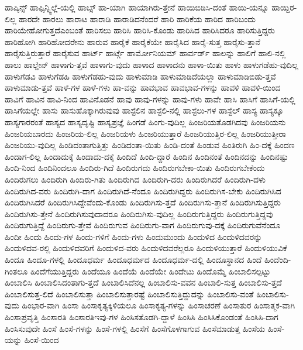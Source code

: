 {ಹಾಪ್ಕಿನ್ಸ್
ಹಾಫ್ಕಿನ್ಸ್ವಿಲ್ಲೆ-ಯಲ್ಲಿ
ಹಾಬ್ಸ್
ಹಾ-ಯಾಗಿ
ಹಾಯಾಗಿರು-ತ್ತೇನೆ
ಹಾಯಿಬಿಡಿಸಿ-ದಂತೆ
ಹಾಯಿ-ಯನ್ನೂ
ಹಾಯ್ದಿರ-ಲಿಲ್ಲ
ಹಾರದೇ
ಹಾರಲು
ಹಾರಾಟ
ಹಾರಾಡಿ
ಹಾರಾಡಿದನೆಂದರೆ
ಹಾರಿ
ಹಾರಿಕೆಯ
ಹಾರಿದ
ಹಾರಿಬಂದು
ಹಾರಿಯೇಹೋಗುತ್ತದೆಎಂಬಂತೆ
ಹಾರಿಸಲು
ಹಾರಿಸಿ
ಹಾರಿಸಿ-ಕೊಂಡು
ಹಾರಿಸಿದ
ಹಾರಿಸಿದರೂ
ಹಾರಿಸುತ್ತಿದ್ದರು
ಹಾರಿಹೋಗಿ
ಹಾರಿಹೋದರೇನು
ಹಾರುವ
ಹಾರೈಕೆ
ಹಾರೈಕೆಯೇ
ಹಾರೈಸಿದ
ಹಾರೈ-ಸುತ್ತ
ಹಾರೈಸು-ತ್ತಾನೆ
ಹಾರೈಸುತ್ತಿರುತ್ತಾರೆ
ಹಾರೈಸುವ
ಹಾರ್ಟ್
ಹಾರ್ಟ್ಗೆ
ಹಾರ್ಮೋನಿಯಮ್
ಹಾರ್ವರ್ಡ್
ಹಾಲನ್ನು
ಹಾಲಿಗೆ
ಹಾಲಿ-ನಲ್ಲಿ
ಹಾಲು
ಹಾಲ್ಡೇನ್
ಹಾಳಾಗು-ತ್ತವೆ
ಹಾಳಾಗು-ವುದು
ಹಾಳಾದ
ಹಾಳಾದನು
ಹಾಳಾ-ಯಿತು
ಹಾಳು
ಹಾಳುಗಡೆಹು-ವುದಿಲ್ಲ
ಹಾಳುಗೆಡವಿ
ಹಾಳುಗೆಡಹಿ
ಹಾಳುಗೆಡಹು-ವುದು
ಹಾಳುಮಾಡಿ
ಹಾಳುಮಾಡಿದೆಯಲ್ಲಾ
ಹಾಳುಮಾಡಿಬಿಡು-ತ್ತವೆ
ಹಾಳುಮಾಡು-ತ್ತವೆ
ಹಾಳೆ-ಗಳ
ಹಾಳೆ-ಗಳು
ಹಾ-ವನ್ನು
ಹಾವಭಾವ
ಹಾವಭಾವ-ಗಳನ್ನು
ಹಾವಳಿ
ಹಾವಳಿ-ಯಿಂದ
ಹಾವಿಗೆ
ಹಾವಿನ
ಹಾವಿ-ನಿಂದ
ಹಾವಿನೊಡನೆ
ಹಾವು
ಹಾವು-ಗಳನ್ನು
ಹಾವು-ಗಳು
ಹಾವೇ
ಹಾಸಿ
ಹಾಸಿಗೆ
ಹಾಸಿಗೆ-ಯಲ್ಲಿ
ಹಾಸಿಗೆಯಲ್ಲೇ
ಹಾಸು
ಹಾಸುಹೊಕ್ಕಾಗಿರುವುವು
ಹಾಸ್ಟೆಲಿನ
ಹಾಸ್ಟೆಲಿ-ನಲ್ಲಿ
ಹಾಸ್ಟೆಲು-ಗಳ
ಹಾಸ್ಟೆಲ್
ಹಾಸ್ಯ
ಹಾಸ್ಯಕ್ಕೂ
ಹಾಸ್ಯಗಾರರಂತೆ
ಹಾಸ್ಯದ
ಹಾಸ್ಯದೃಷ್ಟಿ
ಹಾಸ್ಯಪ್ರಜ್ಞೆ
ಹಿಂಗಡೆ
ಹಿಂಗು-ವುದಿಲ್ಲ
ಹಿಂಜರಿಯತೊಡಗಿದವು
ಹಿಂಜರಿಯನು
ಹಿಂಜರಿಯಬಾರದು
ಹಿಂಜರಿಯ-ಲಿಲ್ಲ
ಹಿಂಜರಿಯಳು
ಹಿಂಜರಿಯುತ್ತಾರೆ
ಹಿಂಜರಿಯುತ್ತಿರ-ಲಿಲ್ಲ
ಹಿಂಜರಿಯುತ್ತೀರಾ
ಹಿಂಜರಿಯು-ವುದಿಲ್ಲ
ಹಿಂಡಿದಂತಾಗುತ್ತಿತ್ತು
ಹಿಂಡಿದಂತಾ-ಯಿತು
ಹಿಂಡಿ-ದಂತೆ
ಹಿಂಡುವ
ಹಿಂತಿರುಗಿ
ಹಿಂ-ದಕ್ಕೆ
ಹಿಂದಣ
ಹಿಂದಾಗ-ಲಿಲ್ಲ
ಹಿಂದಾದುಕ್ಕೆ
ಹಿಂದಾದು-ದಕ್ಕೆ
ಹಿಂದಿದೆ
ಹಿಂದಿ-ದ್ದಾರೆ
ಹಿಂದಿನ
ಹಿಂದಿನಂತೆ
ಹಿಂದಿನದನ್ನು
ಹಿಂದಿನಷ್ಟು
ಹಿಂದಿ-ನಿಂದ
ಹಿಂದಿನಿಂದಲೂ
ಹಿಂದಿರು-ಗಿದೆ
ಹಿಂದಿರುಗದು
ಹಿಂದಿರುಗಬೇಕಾ-ಯಿತು
ಹಿಂದಿರುಗಬೇಕೆಂದು
ಹಿಂದಿರುಗಲು
ಹಿಂದಿರುಗಿ
ಹಿಂದಿರು-ಗಿತು
ಹಿಂದಿರುಗಿದ
ಹಿಂದಿರುಗಿ-ದರು
ಹಿಂದಿರುಗಿದರೆ
ಹಿಂದಿರುಗಿ-ದಳು
ಹಿಂದಿರುಗಿದ-ವರು
ಹಿಂದಿರುಗಿ-ದಾಗ
ಹಿಂದಿರುಗಿದೆ-ನೆಂದೂ
ಹಿಂದಿರುಗಿದ್ದರು
ಹಿಂದಿರುಗಿಸ-ಬೇಕು
ಹಿಂದಿರುಗಿಸಿದ
ಹಿಂದಿರುಗಿಸಿದರೆ
ಹಿಂದಿರುಗಿಸಿದ್ದೇವೆಂದು-ಕೊಂಡು
ಹಿಂದಿರುಗಿಸು-ತ್ತದೆ
ಹಿಂದಿರುಗಿಸು-ತ್ತಾನೆ
ಹಿಂದಿರುಗಿಸುತ್ತಿದ್ದರು
ಹಿಂದಿರುಗಿಸು-ತ್ತೇನೆ
ಹಿಂದಿರುಗಿಸುವುದಾದರೂ
ಹಿಂದಿರುಗಿಸು-ವುದಿಲ್ಲ
ಹಿಂದಿರುಗುತ್ತಿದ್ದರು
ಹಿಂದಿರುಗುತ್ತಿದ್ದವು
ಹಿಂದಿರುಗುತ್ತಿದ್ದೆ
ಹಿಂದಿರುಗು-ತ್ತೇವೆ
ಹಿಂದಿರುಗುವ
ಹಿಂದಿರುಗು-ವಾಗ
ಹಿಂದಿರುಗುವು-ದಕ್ಕೆ
ಹಿಂದಿರುಗುವೆನೆಂದೂ
ಹಿಂದೀ
ಹಿಂದು
ಹಿಂದು-ಗಳ
ಹಿಂದು-ಗಳಿಗೆ
ಹಿಂದು-ಗಳು
ಹಿಂದುಮುಂದು
ಹಿಂದುಳಿದ
ಹಿಂದುಳಿದವರನ್ನು
ಹಿಂದುಳಿದವ-ರಲ್ಲಿ
ಹಿಂದುಳಿದವರಿಗೆ
ಹಿಂದುಳಿದ-ವರು
ಹಿಂದುಳಿದವರೆಲ್ಲರೂ
ಹಿಂದುಳಿಯುತ್ತಾರೆ
ಹಿಂದುಳಿಯುವಿಕೆ
ಹಿಂದೂ
ಹಿಂದೂ-ಗಳಲ್ಲಿ
ಹಿಂದೂಧರ್ಮ
ಹಿಂದೂಧರ್ಮದ
ಹಿಂದೂಧರ್ಮ-ದಲ್ಲಿ
ಹಿಂದೂಸ್ಥಾನದ
ಹಿಂದೆ
ಹಿಂದೆಂದಿ-ಗಿಂತಲೂ
ಹಿಂದೆಗೆಯುತ್ತಿದ್ದರು
ಹಿಂದೆಯೂ
ಹಿಂದೆಯೆ
ಹಿಂದೆಯೇ
ಹಿಂದೇಟು
ಹಿಂದೊಮ್ಮೆ
ಹಿಂಬಾಲಿಸಲ್ಪಟ್ಟು
ಹಿಂಬಾಲಿಸಿ
ಹಿಂಬಾಲಿಸಿದಂತಾಗು-ತ್ತದೆ
ಹಿಂಬಾಲಿಸಿದೆನಲ್ಲ
ಹಿಂಬಾಲಿಸು-ವವನ
ಹಿಂಬಾಲಿ-ಸುತ್ತ
ಹಿಂಬಾಲಿಸು-ತ್ತದೆ
ಹಿಂಬಾಲಿಸುತ್ತ-ಲಿದೆ
ಹಿಂಬಾಲಿಸುತ್ತಾ
ಹಿಂಬಾಲಿಸುತ್ತಾರಷ್ಟೆ
ಹಿಂಬಾಲಿಸುತ್ತಿದ್ದುದನ್ನು
ಹಿಂಬಾಲಿಸು-ವಂತೆ
ಹಿಂಬಾಲಿಸು-ವುದು
ಹಿಂಭಾರ-ವಾಗಿ
ಹಿಂಸಾ
ಹಿಂಸಾಕೃತ್ಯಕ್ಕಿಳಿಯಲೂ
ಹಿಂಸಾಕೃತ್ಯ-ಗಳನ್ನು
ಹಿಂಸಾಚರಣೆ
ಹಿಂಸಾತುರ
ಹಿಂಸಾತ್ಮಕ-ವಾಗಿ
ಹಿಂಸಾಪ್ರವೃತ್ತಿ
ಹಿಂಸಾರತಿ
ಹಿಂಸಾರತಿಇವು-ಗಳ
ಹಿಂಸಿಸತೊಡಗಿ-ದ್ದಾಳೆ
ಹಿಂಸಿಸಿ
ಹಿಂಸಿಸಿಕೊಂಡಂತೆ
ಹಿಂಸಿಸಿ-ದಾಗ
ಹಿಂಸಿಸುವುದೇ
ಹಿಂಸೆ
ಹಿಂಸೆ-ಗಳನ್ನು
ಹಿಂಸೆ-ಗಳಲ್ಲಿ
ಹಿಂಸೆಗೆ
ಹಿಂಸೆಗೊಳಗಾಗುವ
ಹಿಂಸೆಮಾಡುತ್ತ
ಹಿಂಸೆಯ
ಹಿಂಸೆ-ಯನ್ನು
ಹಿಂಸೆ-ಯಿಂದ
}
